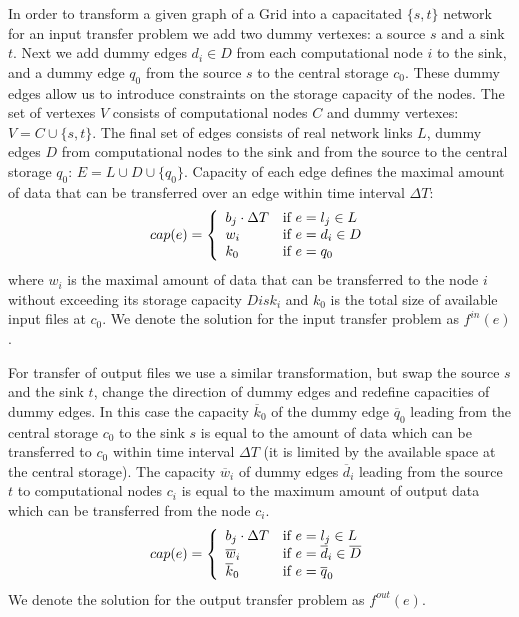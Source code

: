 \documentclass{svjour3}                     %
\begin{document}
In order to transform a given graph of a Grid into a capacitated $\{s,t\}$
network for an input transfer problem we add two dummy vertexes: a source $s$
and a sink $t$. Next we add  dummy edges $d_{i} \in D$ from each computational
node $i$ to the sink, and a dummy edge $q_{0}$ from the source $s$ to the
central storage $c_{0}$. These dummy edges allow us to introduce constraints
on the storage capacity of the nodes. The set of vertexes $V$ consists of
computational nodes $C$ and dummy vertexes: $V= C \cup \{s,t\}$. The final set
of edges consists of real network links $L$, dummy edges $D$ from
computational nodes to the sink and from the source to the central storage
$q_{0}$: $E= L \cup D \cup \{q_{0}\}$. Capacity of each edge defines the
maximal amount of data that can be transferred over an edge within time
interval $\Delta T$: 
%
\begin{equation} 
\label{edge_cap} 
cap(e) = \left\{
\begin{array}{l l} 
b_{j} \cdot \Delta T & \text{if }e = l_{j} \in L \\ w_{i} &
\text{if } e = d_{i} \in D\\ k_{0} & \text{if } e = q_{0} 
\end{array} \right.
\end{equation} 
%
where $w_{i}$ is the maximal amount of data that can be
transferred to the node $i$ without exceeding its storage capacity $Disk_{i}$
and $k_{0}$ is the total size of available input files at $c_{0}$. We denote
the solution for the input transfer problem as $f^{in}(e)$.

For transfer of output files we use a similar transformation, but swap the
source $s$ and the sink $t$, change the direction of dummy edges and redefine
capacities of dummy edges. In this case the capacity $\overline{k}_{0}$ of the
dummy edge $\overline{q}_{0}$ leading from the central storage $c_0$ to the
sink $s$ is equal to the amount of data which can be transferred to $c_0$
within time interval $\Delta T$ (it is limited by the available space at the
central storage). The capacity $\overline{w}_{i}$ of dummy edges
$\overline{d}_{i}$ leading from the source $t$ to computational nodes $c_{i}$
is equal to the maximum amount of output data which can be transferred from
the node $c_{i}$.
%
\begin{equation}
\label{edge_cap_out}
cap(e) = \left\{ 
  \begin{array}{l l}
    b_{j} \cdot \Delta T & \text{if }e = l_{j} \in L \\
    \overline{w}_{i} & \text{if } e = \overline{d}_{i} \in \overline{D}\\
    \overline{k}_{0} & \text{if } e = \overline{q}_{0}
  \end{array} \right.
\end{equation}
%
We denote the solution for the output transfer problem as $f^{out}(e)$.
\end{document}
